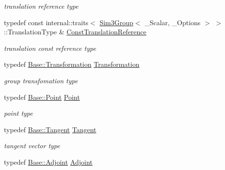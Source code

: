 \begin{DoxyCompactItemize}
\begin{DoxyCompactList}\small\item\em translation reference type \end{DoxyCompactList}\item 
typedef const internal\+::traits$<$ \hyperlink{class_sophus_1_1_sim3_group}{Sim3\+Group}$<$ \+\_\+\+Scalar, \+\_\+\+Options $>$ $>$\+::Translation\+Type \& \hyperlink{class_sophus_1_1_sim3_group_a11a3c75cf3bdad1f730722cf1767e012}{Const\+Translation\+Reference}\hypertarget{class_sophus_1_1_sim3_group_a11a3c75cf3bdad1f730722cf1767e012}{}\label{class_sophus_1_1_sim3_group_a11a3c75cf3bdad1f730722cf1767e012}

\begin{DoxyCompactList}\small\item\em translation const reference type \end{DoxyCompactList}\item 
typedef \hyperlink{class_sophus_1_1_sim3_group_base_a93c8c564e3386709dc4cb2fc6d451dd8}{Base\+::\+Transformation} \hyperlink{class_sophus_1_1_sim3_group_a0b3a5b31501e1358aa760c91e128db9f}{Transformation}\hypertarget{class_sophus_1_1_sim3_group_a0b3a5b31501e1358aa760c91e128db9f}{}\label{class_sophus_1_1_sim3_group_a0b3a5b31501e1358aa760c91e128db9f}

\begin{DoxyCompactList}\small\item\em group transfomation type \end{DoxyCompactList}\item 
typedef \hyperlink{class_sophus_1_1_sim3_group_base_a4b50c6b94e402746e50076305781dc9d}{Base\+::\+Point} \hyperlink{class_sophus_1_1_sim3_group_a1848018ed54875cbfe8fc437cb02237d}{Point}\hypertarget{class_sophus_1_1_sim3_group_a1848018ed54875cbfe8fc437cb02237d}{}\label{class_sophus_1_1_sim3_group_a1848018ed54875cbfe8fc437cb02237d}

\begin{DoxyCompactList}\small\item\em point type \end{DoxyCompactList}\item 
typedef \hyperlink{class_sophus_1_1_sim3_group_base_a0f61582b6d8fa46ecbb40d70c87b632c}{Base\+::\+Tangent} \hyperlink{class_sophus_1_1_sim3_group_a4988923bd1230999bb6a9eef6439810b}{Tangent}\hypertarget{class_sophus_1_1_sim3_group_a4988923bd1230999bb6a9eef6439810b}{}\label{class_sophus_1_1_sim3_group_a4988923bd1230999bb6a9eef6439810b}

\begin{DoxyCompactList}\small\item\em tangent vector type \end{DoxyCompactList}\item 
typedef \hyperlink{class_sophus_1_1_sim3_group_base_a7aa93f325ac7b811db77652f488e8f03}{Base\+::\+Adjoint} \hyperlink{class_sophus_1_1_sim3_group_a0fd8d9f8b06a3996a404c5dc2208fe63}{Adjoint}\hypertarget{class_sophus_1_1_sim3_group_a0fd8d9f8b06a3996a404c5dc2208fe63}{}\label{class_sophus_1_1_sim3_group_a0fd8d9f8b06a3996a404c5dc2208fe63}


\end{DoxyCompactItemize}
